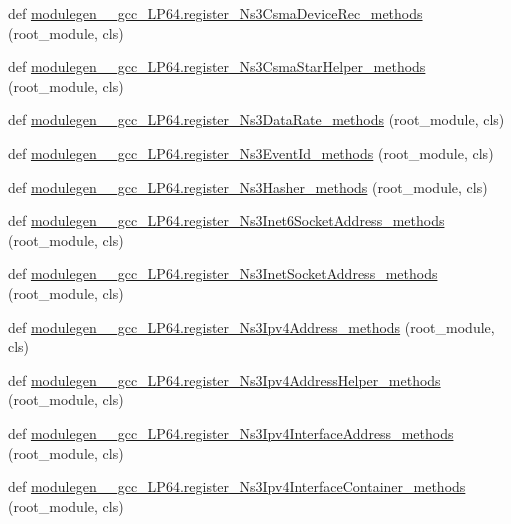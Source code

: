 \begin{DoxyCompactItemize}
\item 
def \hyperlink{namespacemodulegen____gcc__LP64_a15420b4254db2749fe9f208bfdcc532f}{modulegen\+\_\+\+\_\+gcc\+\_\+\+L\+P64.\+register\+\_\+\+Ns3\+Csma\+Device\+Rec\+\_\+methods} (root\+\_\+module, cls)
\item 
def \hyperlink{namespacemodulegen____gcc__LP64_acb297a36159a6feb9a3e9c31455526e2}{modulegen\+\_\+\+\_\+gcc\+\_\+\+L\+P64.\+register\+\_\+\+Ns3\+Csma\+Star\+Helper\+\_\+methods} (root\+\_\+module, cls)
\item 
def \hyperlink{namespacemodulegen____gcc__LP64_acee8aed9090be58f00e76c4c73ae1396}{modulegen\+\_\+\+\_\+gcc\+\_\+\+L\+P64.\+register\+\_\+\+Ns3\+Data\+Rate\+\_\+methods} (root\+\_\+module, cls)
\item 
def \hyperlink{namespacemodulegen____gcc__LP64_a11034b778f9a07d9c47a0824be6df6c6}{modulegen\+\_\+\+\_\+gcc\+\_\+\+L\+P64.\+register\+\_\+\+Ns3\+Event\+Id\+\_\+methods} (root\+\_\+module, cls)
\item 
def \hyperlink{namespacemodulegen____gcc__LP64_a6615c86326777b99b9d48f2543fa24fb}{modulegen\+\_\+\+\_\+gcc\+\_\+\+L\+P64.\+register\+\_\+\+Ns3\+Hasher\+\_\+methods} (root\+\_\+module, cls)
\item 
def \hyperlink{namespacemodulegen____gcc__LP64_a33ba058421864db1972ed4a87cb086fe}{modulegen\+\_\+\+\_\+gcc\+\_\+\+L\+P64.\+register\+\_\+\+Ns3\+Inet6\+Socket\+Address\+\_\+methods} (root\+\_\+module, cls)
\item 
def \hyperlink{namespacemodulegen____gcc__LP64_ac7474a92931aa2d401ee9815d47b594e}{modulegen\+\_\+\+\_\+gcc\+\_\+\+L\+P64.\+register\+\_\+\+Ns3\+Inet\+Socket\+Address\+\_\+methods} (root\+\_\+module, cls)
\item 
def \hyperlink{namespacemodulegen____gcc__LP64_a52c7eb3519820103a7ff4aaf269a6c89}{modulegen\+\_\+\+\_\+gcc\+\_\+\+L\+P64.\+register\+\_\+\+Ns3\+Ipv4\+Address\+\_\+methods} (root\+\_\+module, cls)
\item 
def \hyperlink{namespacemodulegen____gcc__LP64_a9c3372167e83cd44639aee3cbb1c755f}{modulegen\+\_\+\+\_\+gcc\+\_\+\+L\+P64.\+register\+\_\+\+Ns3\+Ipv4\+Address\+Helper\+\_\+methods} (root\+\_\+module, cls)
\item 
def \hyperlink{namespacemodulegen____gcc__LP64_ab9793a525e51129c8830f907cac6a681}{modulegen\+\_\+\+\_\+gcc\+\_\+\+L\+P64.\+register\+\_\+\+Ns3\+Ipv4\+Interface\+Address\+\_\+methods} (root\+\_\+module, cls)
\item 
def \hyperlink{namespacemodulegen____gcc__LP64_a0a073d41194db84d0ade6617f8a94cd6}{modulegen\+\_\+\+\_\+gcc\+\_\+\+L\+P64.\+register\+\_\+\+Ns3\+Ipv4\+Interface\+Container\+\_\+methods} (root\+\_\+module, cls)

\end{DoxyCompactItemize}
